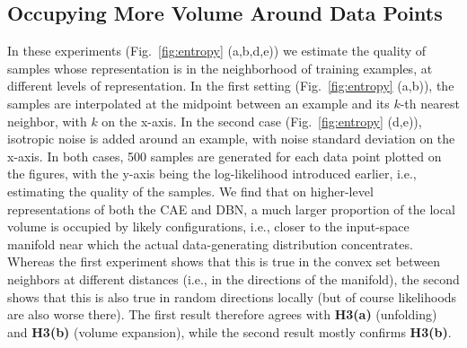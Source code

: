 \vspace*{-1mm}
\subsection{Occupying More Volume Around Data Points}
\vspace*{-1mm}

In these experiments (Fig.~\ref{fig:entropy} (a,b,d,e)) we estimate the quality of samples whose representation is in
the neighborhood of training examples, at different levels of representation.
In the first setting (Fig.~\ref{fig:entropy} (a,b)), the samples are interpolated at the midpoint
between an example and its $k$-th nearest neighbor, with $k$ on the x-axis. 
In the second case (Fig.~\ref{fig:entropy} (d,e)),
isotropic noise is added around an example, with noise standard deviation on the x-axis. 
In both cases, 500 samples are generated
for each data point plotted on the figures, with the y-axis being the log-likelihood
introduced earlier, i.e., estimating the quality of the samples.
We find that on higher-level representations of both the CAE and DBN, a much
larger proportion of the local volume is occupied by likely configurations,
i.e., closer to the input-space manifold near which the actual data-generating
distribution concentrates. Whereas the first experiment shows that this is true
in the convex set between neighbors at different distances (i.e., in the directions
of the manifold), the second shows that this is also true in random directions locally
(but of course likelihoods are also worse there). The first result therefore
agrees with {\bf H3(a)} (unfolding) and {\bf H3(b)} (volume expansion), while
the second result mostly confirms {\bf H3(b)}.
